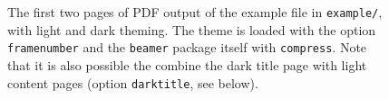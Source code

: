 \begin{figure}

\caption{The first two pages of PDF output of the example file in
\lstinline!example/!, with light and dark theming. The theme is loaded with the
option \lstinline!framenumber! and the \texttt{beamer} package itself with
\lstinline!compress!. Note that it is also possible the combine the dark title
page with light content pages (option \lstinline!darktitle!, see below).}
\label{fig:example1}
\end{figure}


